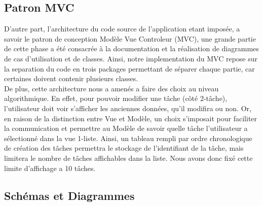 \documentclass[a4paper,10pt]{article}
\begin{document}
\subsection{Patron MVC}
 D'autre part, l'architecture du code source de l'application etant imposée, a savoir le patron de conception Modèle Vue Controleur (MVC), une grande partie de cette phase a été consacrée à la documentation et la réalisation de diagrammes de cas d'utilisation et de classes.
Ainsi, notre implementation du MVC repose sur la separation du code en trois packages permettant de séparer chaque partie, car certaines doivent contenir plusieurs classes. 
\\
De plus, cette architecture nous a amenés a faire des choix au niveau algorithmique. En effet, pour pouvoir modifier une tâche (côté 2-tâche), l'utilisateur doit voir s'afficher les anciennes données, qu'il modifira ou non.
Or, en raison de la distinction entre Vue et Modèle, un choix s'imposait pour faciliter la communication et permettre au Modèle de savoir quelle tâche l'utilisateur a sélectionné dans la vue 1-liste. Ainsi, un tableau rempli par ordre chronologique de création des tâches permettra le stockage de l'identifiant de la tâche, mais limitera le nombre de tâches affichables dans la liste. Nous avons donc fixé cette limite d'affichage a 10 tâches.
\\
\subsection{Schémas et Diagrammes}
\end{document}
